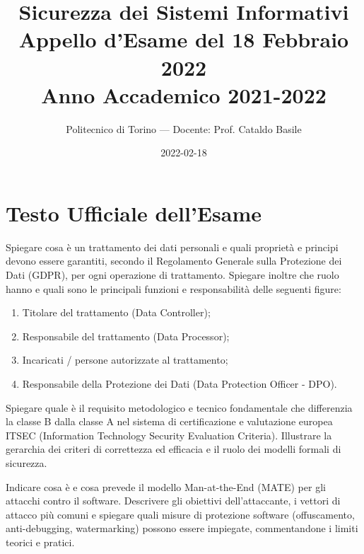 \documentclass[11pt,a4paper]{article}
\begin{document}
\title{\textbf{Sicurezza dei Sistemi Informativi} \\ \large Appello d'Esame del 18 Febbraio 2022 \\ \small Anno Accademico 2021-2022}
\author{Politecnico di Torino --- Docente: Prof. Cataldo Basile}
\date{2022-02-18}
\maketitle


\section{Testo Ufficiale dell'Esame}

\begin{questionbox}
Spiegare cosa \`e un trattamento dei dati personali e quali propriet\`a e principi devono essere garantiti, secondo il Regolamento Generale sulla Protezione dei Dati (GDPR), per ogni operazione di trattamento.
Spiegare inoltre che ruolo hanno e quali sono le principali funzioni e responsabilit\`a delle seguenti figure:
\begin{enumerate}[label=\alph*.]
    \item Titolare del trattamento (Data Controller);
    \item Responsabile del trattamento (Data Processor);
    \item Incaricati / persone autorizzate al trattamento;
    \item Responsabile della Protezione dei Dati (Data Protection Officer - DPO).
\end{enumerate}
\end{questionbox}

\begin{questionbox}
Spiegare quale \`e il requisito metodologico e tecnico fondamentale che differenzia la classe B dalla classe A nel sistema di certificazione e valutazione europea ITSEC (Information Technology Security Evaluation Criteria). Illustrare la gerarchia dei criteri di correttezza ed efficacia e il ruolo dei modelli formali di sicurezza.
\end{questionbox}

\begin{questionbox}
Indicare cosa \`e e cosa prevede il modello Man-at-the-End (MATE) per gli attacchi contro il software. Descrivere gli obiettivi dell'attaccante, i vettori di attacco pi\`u comuni e spiegare quali misure di protezione software (offuscamento, anti-debugging, watermarking) possono essere impiegate, commentandone i limiti teorici e pratici.
\end{questionbox}
\end{document}
